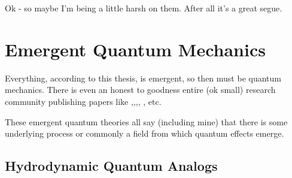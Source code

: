 \documentclass[../rzero]{subfiles}
\begin{document}
Ok - so maybe I'm being a little harsh on them. After all it's a great segue.   

\section{Emergent Quantum Mechanics}\label{emergentQMSection}
Everything, according to this thesis, is emergent, so then must be quantum mechanics. There is even an honest to goodness entire (ok small) research community publishing papers like \cite{tHooft2007},\cite{Grossing2012},\cite{acostaEMERGENTQUANTUMMECHANICS2012},\cite{Walleczek2019}, \cite{Durey2018}, \cite{Andersen2016} etc. 

These emergent quantum theories all say (including mine) that there is some underlying process or commonly a field from which quantum effects emerge.

\subsection{Hydrodynamic Quantum Analogs}
\end{document}
